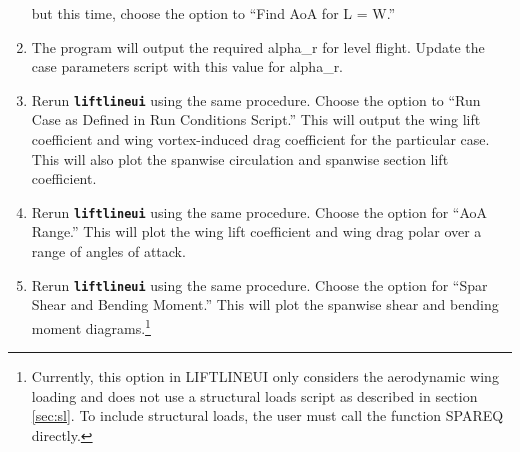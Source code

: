 \documentclass{article}
\begin{document}
\begin{enumerate}
    but this time, choose the option to ``Find AoA for L = W.''
  \item The program will output the required alpha\_r for level
    flight.  Update the case parameters script with this value for
    alpha\_r.
  \item Rerun \texttt{\textbf{liftlineui}} using the same procedure.
    Choose the option to ``Run Case as Defined in Run Conditions
    Script.''  This will output the wing lift coefficient and wing
    vortex-induced drag coefficient for the particular case.  This
    will also plot the spanwise circulation and spanwise section lift
    coefficient.
  \item Rerun \texttt{\textbf{liftlineui}} using the same procedure.
    Choose the option for ``AoA Range.''  This will plot the wing lift
    coefficient and wing drag polar over a range of angles of attack.
  \item Rerun \texttt{\textbf{liftlineui}} using the same procedure.
    Choose the option for ``Spar Shear and Bending Moment.''  This
    will plot the spanwise shear and bending moment
    diagrams.\footnote{Currently, this option in LIFTLINEUI only
      considers the aerodynamic wing loading and does not use a
      structural loads script as described in section \ref{sec:sl}.
      To include structural loads, the user must call the function
      SPAREQ directly.}
\end{enumerate}
\newpage
\printbibliography
\end{document}
